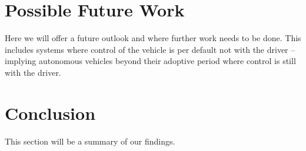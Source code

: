 \documentclass{acm_proc_article-sp}
\begin{document}
\section{Possible Future Work}

Here we will offer a future outlook and where further work needs to be done.
This includes systems where control of the vehicle is per default not with the driver – implying autonomous vehicles beyond their adoptive period where control is still with the driver.

\section{Conclusion}

This section will be a summary of our findings.


  

\balancecolumns
\end{document}

